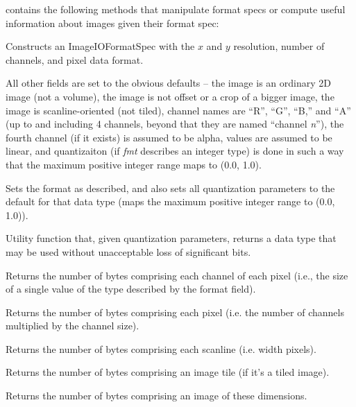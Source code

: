  contains the following methods that
manipulate format specs or compute useful information about images given
their format spec:

Constructs an ImageIOFormatSpec with the $x$ and $y$ resolution, number
of channels, and pixel data format.

All other fields are set to the obvious defaults -- the image is an
ordinary 2D image (not a volume), the image is not offset or a crop of a
bigger image, the image is scanline-oriented (not tiled), channel names
are ``R'', ``G'', ``B,'' and ``A'' (up to and including 4 channels,
beyond that they are named ``channel \emph{n}''), the fourth channel (if
it exists) is assumed to be alpha, values are assumed to be linear, and
quantizaiton (if \emph{fmt} describes an integer type) is done in
such a way that the maximum positive integer range maps to (0.0, 1.0).
\apiend

Sets the format as described, and also sets all quantization parameters
to the default for that data type (maps the maximum positive integer
range to (0.0, 1.0)).
\apiend

Utility function that, given quantization parameters, returns a data
type that may be used without unacceptable loss of significant bits.
\apiend

Returns the number of bytes comprising each channel of each pixel (i.e.,
the size of a single value of the type described by the {\kw format} field).
\apiend

Returns the number of bytes comprising each pixel (i.e. the number of
channels multiplied by the channel size).
\apiend

Returns the number of bytes comprising each scanline (i.e. {\kw width} pixels).
\apiend

Returns the number of bytes comprising an image tile (if it's a tiled image).
\apiend

Returns the number of bytes comprising an image of these dimensions.
\apiend

